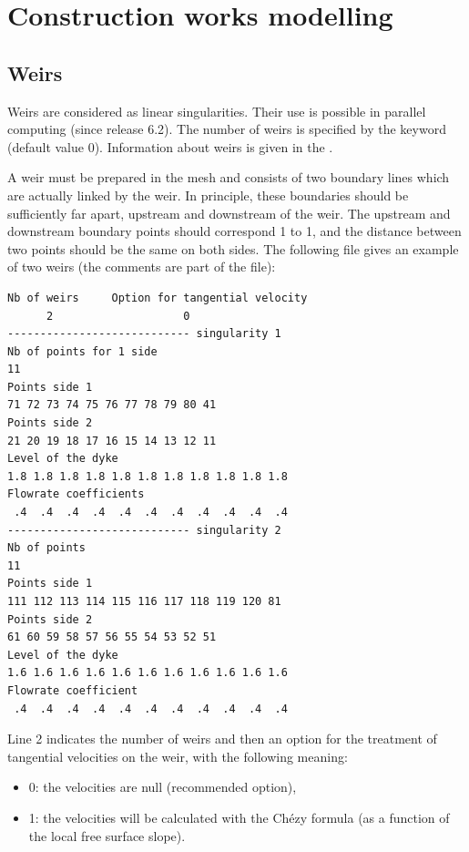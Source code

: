 \chapter{Construction works modelling}
\label{ch:constr:wm}

\section{Weirs}
\label{sec:weirs}
Weirs are considered as linear singularities.
Their use is possible in parallel computing (since release 6.2).
The number of weirs is specified by the keyword 
(default value 0).
Information about weirs is given in the .

A weir must be prepared in the mesh and consists of two boundary lines which are
actually linked by the weir.
In principle, these boundaries should be sufficiently far apart,
upstream and downstream of the weir.
The upstream and downstream boundary points should correspond 1 to 1,
and the distance between two points should be the same on both sides.
The following file gives an example of two weirs (the comments are part of the
file):
\begin{lstlisting}[language=bash]
Nb of weirs     Option for tangential velocity
      2                    0
---------------------------- singularity 1
Nb of points for 1 side
11
Points side 1
71 72 73 74 75 76 77 78 79 80 41
Points side 2
21 20 19 18 17 16 15 14 13 12 11
Level of the dyke
1.8 1.8 1.8 1.8 1.8 1.8 1.8 1.8 1.8 1.8 1.8
Flowrate coefficients
 .4  .4  .4  .4  .4  .4  .4  .4  .4  .4  .4
---------------------------- singularity 2
Nb of points
11
Points side 1
111 112 113 114 115 116 117 118 119 120 81
Points side 2
61 60 59 58 57 56 55 54 53 52 51
Level of the dyke
1.6 1.6 1.6 1.6 1.6 1.6 1.6 1.6 1.6 1.6 1.6
Flowrate coefficient
 .4  .4  .4  .4  .4  .4  .4  .4  .4  .4  .4
\end{lstlisting}

Line 2 indicates the number of weirs and then an option for the treatment
of tangential velocities on the weir, with the following meaning:

\begin{itemize}
\item 0: the velocities are null (recommended option),

\item 1: the velocities will be calculated with the Ch\'{e}zy
formula (as a function of the local free surface slope).
\end{itemize}

